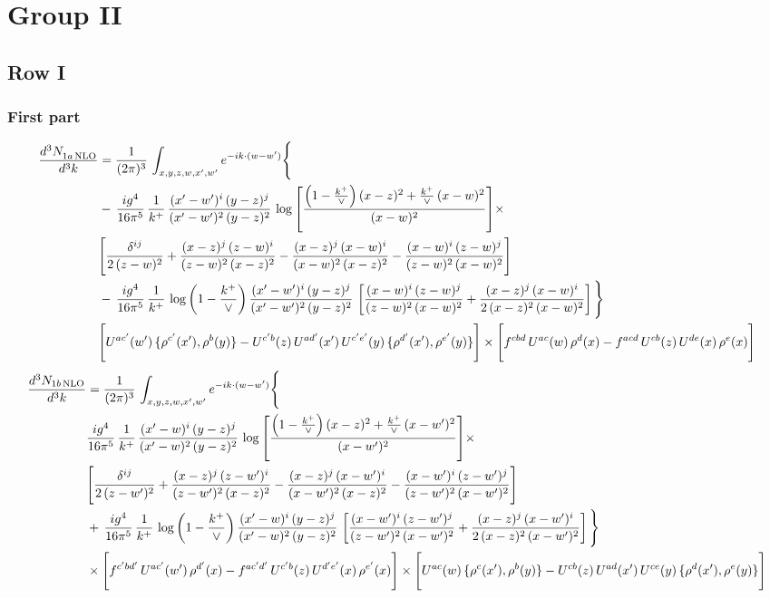 \documentclass[9pt]{article}
\numberwithin{equation}{section}
\begin{document}
\section{Group II}
\subsection{Row I}
\subsubsection{First part}
\begin{align}
 \frac{d^{3}N_{1a\,\rm NLO}^{\rm}}{d^{3}k}  & =     \frac{1}{(2\pi)^{3}}\,\int_{x,y,z,w,x',w^{\prime}} e^{-ik\cdot (w-w')}\Bigg\{\notag \\
& -\, \frac{ig^{4}}{16\pi^{5}}\,\frac{1}{k^{+}}\, \frac{(x'-w')^{i}\,(y-z)^{j}}{(x'-w')^{2}\,(y-z)^{2}}\,\log{\left[\frac{\left(1-\frac{k^{+}}{\vee}\right)(x-z)^{2}+\frac{k^{+}}{\vee}\,(x-w)^{2}}{(x-w)^{2}}\right]}\times\notag \\ &  \Bigg[\frac{\delta^{ij}}{2\,(z-w)^{2}}+\frac{(x-z)^{j}\,(z-w)^{i}}{(z-w)^{2}\,(x-z)^{2}}-\frac{(x-z)^{j}\,(x-w)^{i}}{(x-w)^{2}\,(x-z)^{2}}-\frac{(x-w)^{i}\,(z-w)^{j}}{(z-w)^{2}\,(x-w)^{2}}\Bigg] \notag \\
& -\, \frac{ig^{4}}{16\pi^{5}}\,\frac{1}{k^{+}}\,\log{\left(1-\frac{k^{+}}{\vee}\right)}\,\frac{(x'-w')^{i}\,(y-z)^{j}}{(x'-w')^{2}\,(y-z)^{2}}\,\left[\frac{(x-w)^{i}\,(z-w)^{j}}{(z-w)^{2}\,(x-w)^{2}}+\frac{(x-z)^{j}\,(x-w)^{i}}{2\,(x-z)^{2}\, (x-w)^{2}}\right]\Bigg\} \notag \\ & \Bigg[U^{ac'}(w')\,\{\rho^{c'}(x'),\rho^{b}(y)\}-U^{c'b}(z)\,U^{ad'}(x')\,U^{c'e'}(y)\, \{\rho^{d'}(x'),\rho^{e'}(y)\}\Bigg]\times \Bigg[f^{cbd}\,U^{ac}(w)\,\rho^{d}(x)-f^{acd}\, U^{cb}(z)\,U^{de}(x)\,\rho^{e}(x)\Bigg]
\end{align}
\begin{align}
\frac{d^{3}N_{1b\, \rm NLO}}{d^{3}k} & =  \frac{1}{(2\pi)^{3}}\,\int_{x,y,z,w,x',w^{\prime}} e^{-ik\cdot (w-w')}\Bigg\{\notag \\
&  \frac{ig^{4}}{16\pi^{5}}\,\frac{1}{k^{+}}\, \frac{(x'-w)^{i}\,(y-z)^{j}}{(x'-w)^{2}\,(y-z)^{2}}\,\log{\left[\frac{\left(1-\frac{k^{+}}{\vee}\right)(x-z)^{2}+\frac{k^{+}}{\vee}\,(x-w')^{2}}{(x-w')^{2}}\right]}\times\notag \\ &  \Bigg[\frac{\delta^{ij}}{2\,(z-w')^{2}}+\frac{(x-z)^{j}\,(z-w')^{i}}{(z-w')^{2}\,(x-z)^{2}}-\frac{(x-z)^{j}\,(x-w')^{i}}{(x-w')^{2}\,(x-z)^{2}}-\frac{(x-w')^{i}\,(z-w')^{j}}{(z-w')^{2}\,(x-w')^{2}}\Bigg] \notag \\
& +\,\frac{ig^{4}}{16\pi^{5}}\,\frac{1}{k^{+}}\,\log{\left(1-\frac{k^{+}}{\vee}\right)}\,\frac{(x'-w)^{i}\,(y-z)^{j}}{(x'-w)^{2}\,(y-z)^{2}}\,\left[\frac{(x-w')^{i}\,(z-w')^{j}}{(z-w')^{2}\,(x-w')^{2}}+\frac{(x-z)^{j}\,(x-w')^{i}}{2\,(x-z)^{2}\, (x-w')^{2}}\right]\Bigg\} \notag \\ & \times\Bigg[f^{c'bd'}\,U^{ac'}(w')\,\rho^{d'}(x)-f^{ac'd'}\, U^{c'b}(z)\,U^{d'e'}(x)\,\rho^{e'}(x)\Bigg] \times \Bigg[U^{ac}(w)\,\{\rho^{c}(x'),\rho^{b}(y)\}-U^{cb}(z)\,U^{ad}(x')\,U^{ce}(y)\, \{\rho^{d}(x'),\rho^{e}(y)\}\Bigg]
\end{align}
\end{document}
